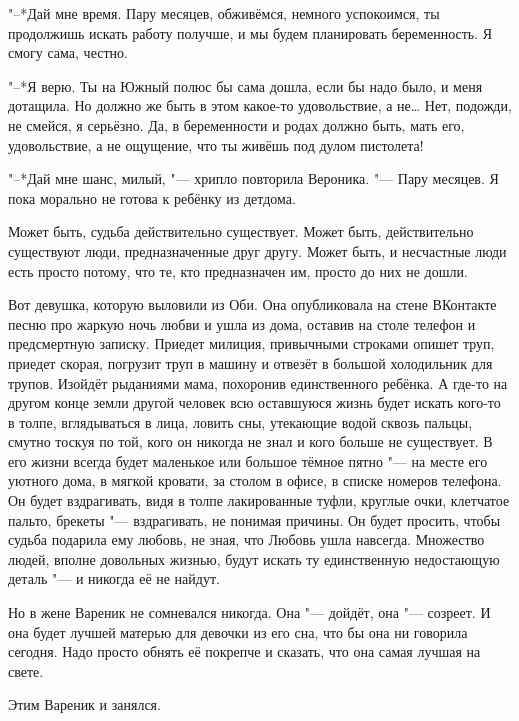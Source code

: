"--*Дай мне время.
Пару месяцев, обживёмся, немного успокоимся, ты продолжишь искать работу получше, и мы будем планировать беременность.
Я смогу сама, честно.

"--*Я верю.
Ты на Южный полюс бы сама дошла, если бы надо было, и меня дотащила.
Но должно же быть в этом какое-то удовольствие, а не\ldots{}
Нет, подожди, не смейся, я серьёзно.
Да, в беременности и родах должно быть, мать его, удовольствие, а не ощущение, что ты живёшь под дулом пистолета!

"--*Дай мне шанс, милый, "--- хрипло повторила Вероника.
"--- Пару месяцев.
Я пока морально не готова к ребёнку из детдома.

\asterism

Может быть, судьба действительно существует.
Может быть, действительно существуют люди, предназначенные друг другу.
Может быть, и несчастные люди есть просто потому, что те, кто предназначен им, просто до них не дошли.

Вот девушка, которую выловили из Оби.
Она опубликовала на стене ВКонтакте песню про жаркую ночь любви и ушла из дома, оставив на столе телефон и предсмертную записку.
Приедет милиция, привычными строками опишет труп, приедет скорая, погрузит труп в машину и отвезёт в большой холодильник для трупов.
Изойдёт рыданиями мама, похоронив единственного ребёнка.
А где-то на другом конце земли другой человек всю оставшуюся жизнь будет искать кого-то в толпе, вглядываться в лица, ловить сны, утекающие водой сквозь пальцы, смутно тоскуя по той, кого он никогда не знал и кого больше не существует.
В его жизни всегда будет маленькое или большое тёмное пятно "--- на месте его уютного дома, в мягкой кровати, за столом в офисе, в списке номеров телефона.
Он будет вздрагивать, видя в толпе лакированные туфли, круглые очки, клетчатое пальто, брекеты "--- вздрагивать, не понимая причины.
Он будет просить, чтобы судьба подарила ему любовь, не зная, что Любовь ушла навсегда.
Множество людей, вполне довольных жизнью, будут искать ту единственную недостающую деталь "--- и никогда её не найдут.

Но в жене Вареник не сомневался никогда.
Она "--- дойдёт, она "--- созреет.
И она будет лучшей матерью для девочки из его сна, что бы она ни говорила сегодня.
Надо просто обнять её покрепче и сказать, что она самая лучшая на свете.

Этим Вареник и занялся.

\asterism

\textspace

\label{Sun_2012_06_10}

